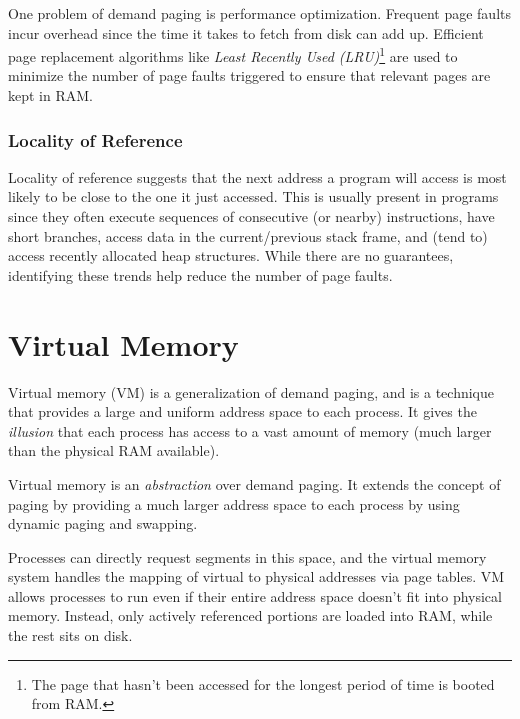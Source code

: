 \documentclass{report}
\newcommand{\abstractionBegin}[1]{\begin{tcolorbox}[colback=violet!5!white,colframe=violet,title={Abstraction:
      #1}]}
\newcommand{\abstractionEnd}{\end{tcolorbox}}
\begin{document}
One problem of demand paging is performance optimization. Frequent page faults incur overhead since
the time it takes to fetch from disk can add up. Efficient page replacement algorithms like
\textit{Least Recently Used (LRU)}\footnote{The page that hasn't been accessed for the longest
  period of time is booted from RAM.} are used to minimize the number of page faults triggered to
ensure that relevant pages are kept in RAM.


\subsection{Locality of Reference}
Locality of reference suggests that the next address a program will access is most likely to be
close to the one it just accessed. This is usually present in programs since they often execute
sequences of consecutive (or nearby) instructions, have short branches, access data in the
current/previous stack frame, and (tend to) access recently allocated heap structures. While there
are no guarantees, identifying these trends help reduce the number of page faults.










\chapter{Virtual Memory}
Virtual memory (VM) is a generalization of demand paging, and is a technique that provides a large
and uniform address space to each process. It gives the \textit{illusion} that each process has
access to a vast amount of memory (much larger than the physical RAM available).

\abstractionBegin{Virtual Memory and Paging}
Virtual memory is an \textit{abstraction} over demand paging. It extends the concept of paging by
providing a much larger address space to each process by using dynamic paging and swapping.
\abstractionEnd

Processes can directly request segments in this space, and the virtual memory system handles the
mapping of virtual to physical addresses via page tables. VM allows processes to run even if their
entire address space doesn't fit into physical memory. Instead, only actively referenced portions
are loaded into RAM, while the rest sits on disk.
\end{document}
